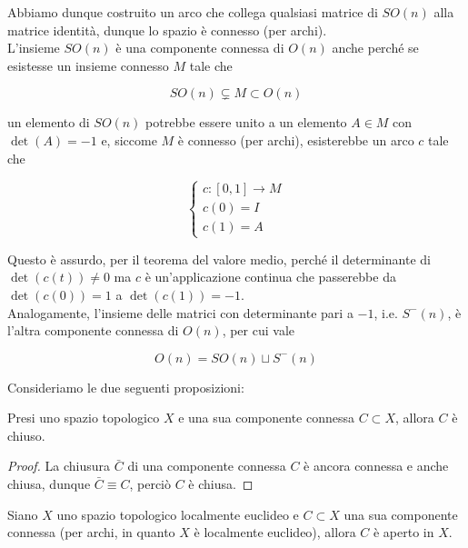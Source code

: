 Abbiamo dunque costruito un arco che collega qualsiasi matrice di $ SO(n) $ alla matrice identità, dunque lo spazio è connesso (per archi).\\
L'insieme $ SO(n) $ è una componente connessa di $ O(n) $ anche perché se esistesse un insieme connesso $ M $ tale che

\begin{equation}
	SO(n) \subsetneq M \subset O(n)
\end{equation}

un elemento di $ SO(n) $ potrebbe essere unito a un elemento $ A \in M $ con $ \det(A) = -1 $ e, siccome $ M $ è connesso (per archi), esisterebbe un arco $ c $ tale che

\begin{equation}
	\begin{cases}
		c : [0,1] \to M \\
		c(0) = I \\
		c(1) = A
	\end{cases}
\end{equation}

Questo è assurdo, per il teorema del valore medio, perché il determinante di $ \det(c(t)) \neq 0 $ ma $ c $ è un'applicazione continua che passerebbe da $ \det(c(0)) = 1 $ a $ \det(c(1)) = -1 $.\\
Analogamente, l'insieme delle matrici con determinante pari a $ -1 $, i.e. $ S^{-}(n) $, è l'altra componente connessa di $ O(n) $, per cui vale

\begin{equation}
	O(n) = SO(n) \sqcup S^{-}(n)
\end{equation}

Consideriamo le due seguenti proposizioni:

\begin{definition}
	Presi uno spazio topologico $ X $ e una sua componente connessa $ C \subset X $, allora $ C $ è chiuso.
\end{definition}

\begin{proof}
	La chiusura $ \bar{C} $ di una componente connessa $ C $ è ancora connessa e anche chiusa, dunque $ \bar{C} \equiv C $, perciò $ C $ è chiusa.
\end{proof}

\begin{definition}\label{prop:conn-comp-open}
	Siano $ X $ uno spazio topologico localmente euclideo e $ C \subset X $ una sua componente connessa (per archi, in quanto $ X $ è localmente euclideo), allora $ C $ è aperto in $ X $.
\end{definition}

